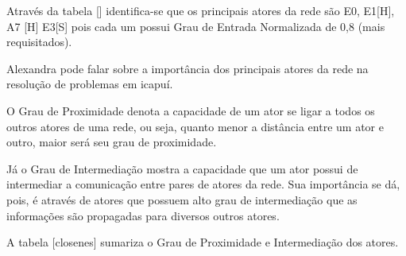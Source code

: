 Através da tabela [] identifica-se que os principais atores da rede são E0, E1[H], A7 [H] E3[S] pois cada um possui Grau de Entrada Normalizada de 0,8 (mais requisitados).

Alexandra pode falar sobre a importância dos principais atores da rede na resolução de problemas em icapuí.

O Grau de Proximidade denota a capacidade de um ator se ligar a todos os outros atores de uma rede, ou seja, quanto menor a distância entre um ator e outro, maior será seu grau de proximidade. 

Já o Grau de Intermediação mostra a capacidade que um ator possui de intermediar a comunicação entre pares de atores da rede. Sua importância se dá, pois, é através de atores que possuem alto grau de intermediação que as informações são propagadas para diversos outros atores. 

A tabela [closenes] sumariza o Grau de Proximidade e Intermediação dos atores.

